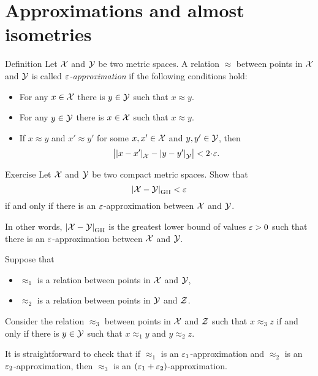 \section{Approximations and almost isometries}\label{sec:GH-approx}

\begin{thm}{Definition}\label{ex:defGHR}
Let $\mathcal{X}$ and $\mathcal{Y}$ be two metric spaces.
A relation $\approx$ between points in $\mathcal{X}$ and $\mathcal{Y}$ is called \emph{$\varepsilon$-approximation} if the following conditions hold:
\begin{itemize}
\item For any $x\in  \mathcal{X}$ there is $y\in \mathcal{Y}$ such that $x\approx y$.
\item For any $y\in  \mathcal{Y}$ there is $x\in \mathcal{X}$ such that $x\approx y$.
\item If $x\approx y$ and $x'\approx y'$ for some $x, x'\in  \mathcal{X}$ and $y,y'\in \mathcal{Y}$, then 
\[\bigl|\dist{x}{x'}{\spc{X}}-\dist{y}{y'}{\spc{Y}}\bigr|<2\cdot\eps.\]
\end{itemize}

\end{thm}

\begin{thm}{Exercise}\label{ex:H-R}
Let $\mathcal{X}$ and $\mathcal{Y}$ be two compact metric spaces.
Show that
\[\dist{\spc{X}}{\spc{Y}}{\GH}<\eps\]
if and only if there is an $\varepsilon$-approximation between $\mathcal{X}$ and $\mathcal{Y}$.

In other words, $\dist{\spc{X}}{\spc{Y}}{\GH}$ is the greatest lower bound of values $\varepsilon>0$ such that  there is an $\varepsilon$-approximation between $\mathcal{X}$ and $\mathcal{Y}$.
\end{thm}

Suppose that 
\begin{itemize}
\item $\approx_1$ is a relation between points in $\mathcal{X}$ and $\mathcal{Y}$,
\item $\approx_2$ is a relation between points in $\mathcal{Y}$ and $\mathcal{Z}$.
\end{itemize}
Consider the relation $\approx_3$ between points in $\mathcal{X}$ and $\mathcal{Z}$ such that
$x\approx_3 z$ if and only if there is $y\in  \mathcal{Y}$ such that 
$x\approx_1 y$ and $y\approx_2 z$.

It is straightforward to check that if $\approx_1$ is an $\varepsilon_1$-approximation and $\approx_2$ is an $\varepsilon_2$-approximation, then $\approx_3$ is an $(\varepsilon_1+\varepsilon_2)$-approximation.

